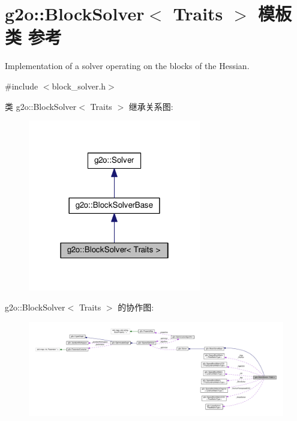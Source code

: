 \hypertarget{classg2o_1_1BlockSolver}{\section{g2o\-:\-:Block\-Solver$<$ Traits $>$ 模板类 参考}
\label{classg2o_1_1BlockSolver}
}


Implementation of a solver operating on the blocks of the Hessian.  




{\ttfamily \#include $<$block\-\_\-solver.\-h$>$}



类 g2o\-:\-:Block\-Solver$<$ Traits $>$ 继承关系图\-:
\nopagebreak
\begin{figure}[H]
\begin{center}
\leavevmode
\includegraphics[width=214pt]{classg2o_1_1BlockSolver__inherit__graph}
\end{center}
\end{figure}


g2o\-:\-:Block\-Solver$<$ Traits $>$ 的协作图\-:
\nopagebreak
\begin{figure}[H]
\begin{center}
\leavevmode
\includegraphics[width=350pt]{classg2o_1_1BlockSolver__coll__graph}
\end{center}
\end{figure}
